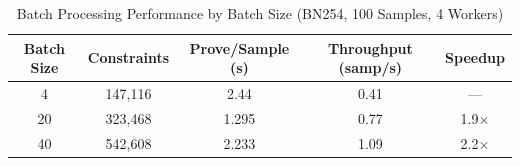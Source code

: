\begin{table}[H]
\centering
\caption{Batch Processing Performance by Batch Size (BN254, 100 Samples, 4 Workers)}
\label{tab:batch}
\begin{tabular}{|c|c|c|c|c|}
\hline
\textbf{Batch Size} & \textbf{Constraints} & \textbf{Prove/Sample (s)} & \textbf{Throughput (samp/s)} & \textbf{Speedup} \\
\hline
4  & 147,116 & 2.44  & 0.41 & --- \\
20 & 323,468 & 1.295 & 0.77 & 1.9$\times$ \\
40 & 542,608 & 2.233 & 1.09 & 2.2$\times$ \\
\hline
\end{tabular}
\end{table}
